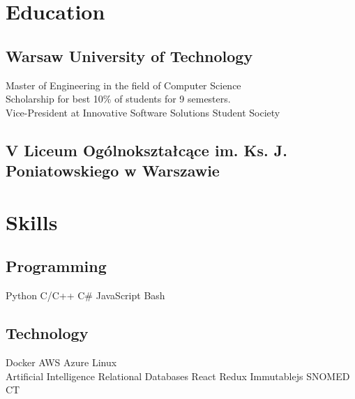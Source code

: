 \documentclass[]{deedy-resume-reversed}
\begin{document}
\begin{minipage}[t]{0.33\textwidth}


\section{Education}

\subsection{Warsaw University of Technology}
Master of Engineering in the field of Computer Science  \\
Scholarship for best 10\% of students for 9 semesters. \\
Vice-President at Innovative Software Solutions Student Society \\
\sectionsep

\subsection{V Liceum Ogólnokształcące im. Ks. J. Poniatowskiego w Warszawie}

\sectionsep


\section{Skills}
\subsection{Programming}
Python \textbullet{} C/C++ \textbullet{} C\# \textbullet{} JavaScript \textbullet{}  Bash \\

\sectionsep

\subsection{Technology}
Docker \textbullet{} AWS \textbullet{} Azure \textbullet{} Linux \textbullet{} \\
Artificial Intelligence \textbullet{} Relational Databases 
\textbullet{} React \textbullet{} Redux \textbullet{} Immutablejs \textbullet{} SNOMED CT
\sectionsep


\end{minipage}
\end{document}
